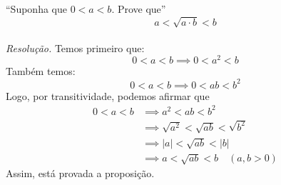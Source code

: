 \enquote{Suponha que $0 < a < b$. Prove que}
\begin{displaymath}
    a < \sqrt{a \cdot b} < b
\end{displaymath}
\\ \emph{Resolução.} Temos primeiro que:
    \begin{displaymath}
        0 < a < b \implies 0 < a^2 < b
    \end{displaymath}
    Também temos:
    \begin{displaymath}
        0 < a < b \implies 0 < ab < b^2
    \end{displaymath}
    Logo, por transitividade, podemos afirmar que
\begin{align*}
   0 < a < b & \implies a^2 < ab < b^2 \\ & \implies
   \sqrt{a^2} < \sqrt{ab} < \sqrt{b^2} \\ & \implies
   |a| < \sqrt{ab} < |b| \\ & \implies
   a < \sqrt{ab} < b \quad (a, b > 0)
\end{align*}
Assim, está provada a proposição.